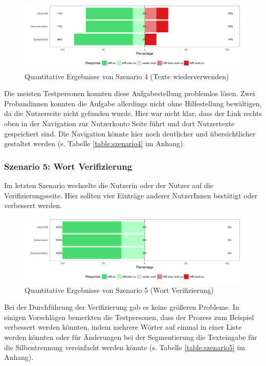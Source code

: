 \begin{figure}[h!]
	\centering
	\includegraphics[width=.8\linewidth]{figures/evaluation/scenario4}
	\caption{Quantitative Ergebnisse von Szenario 4 (Texte wiederverwenden)}
	\label{fig:evaluation-sc4}
\end{figure}

Die meisten Testpersonen konnten diese Aufgabestellung problemlos lösen. Zwei Probandinnen konnten die Aufgabe allerdings nicht ohne Hilfestellung bewältigen, da die Nutzerseite nicht gefunden wurde. Hier war nicht klar, dass der Link rechts oben in der Navigation zur Nutzerkonto Seite führt und dort Nutzertexte gespeichert sind. Die Navigation könnte hier noch deutlicher und übersichtlicher gestaltet werden (s. Tabelle \ref{table:szenario4} im Anhang).

\subsubsection{Szenario 5: Wort Verifizierung}

Im letzten Szenario wechselte die Nutzerin oder der Nutzer auf die Verifizierungsseite. Hier sollten vier Einträge anderer NutzerInnen bestätigt oder verbessert werden.

\begin{figure}[h!]
	\centering
	\includegraphics[width=.8\linewidth]{figures/evaluation/scenario5}
	\caption{Quantitative Ergebnisse von Szenario 5 (Wort Verifizierung)}
	\label{fig:evaluation-sc5}
\end{figure}

Bei der Durchführung der Verifizierung gab es keine größeren Probleme. In einigen Vorschlägen bemerkten die Testpersonen, dass der Prozess zum Beispiel verbessert werden könnten, indem mehrere Wörter auf einmal in einer Liste  werden könnten oder für Änderungen bei der Segmentierung die Texteingabe für die Silbentrennung vereinfacht werden könnte (s. Tabelle \ref{table:szenario5} im Anhang).

